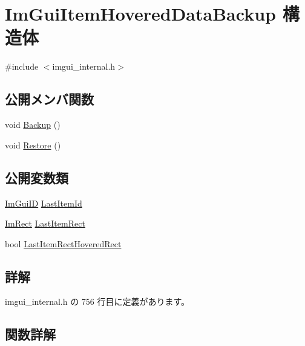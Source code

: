 \hypertarget{struct_im_gui_item_hovered_data_backup}{}\section{Im\+Gui\+Item\+Hovered\+Data\+Backup 構造体}
\label{struct_im_gui_item_hovered_data_backup}


{\ttfamily \#include $<$imgui\+\_\+internal.\+h$>$}

\subsection*{公開メンバ関数}
\begin{DoxyCompactItemize}
\item 
void \mbox{\hyperlink{struct_im_gui_item_hovered_data_backup_a2084500d9cbc9455e52fbe87c95f2315}{Backup}} ()
\item 
void \mbox{\hyperlink{struct_im_gui_item_hovered_data_backup_a4d807799df14f74bde55482134b076cc}{Restore}} ()
\end{DoxyCompactItemize}
\subsection*{公開変数類}
\begin{DoxyCompactItemize}
\item 
\mbox{\hyperlink{imgui_8h_a1785c9b6f4e16406764a85f32582236f}{Im\+Gui\+ID}} \mbox{\hyperlink{struct_im_gui_item_hovered_data_backup_a5e0b18013d983269deba7976666fc501}{Last\+Item\+Id}}
\item 
\mbox{\hyperlink{struct_im_rect}{Im\+Rect}} \mbox{\hyperlink{struct_im_gui_item_hovered_data_backup_ae489c222bed561950104a46ddf1387f3}{Last\+Item\+Rect}}
\item 
bool \mbox{\hyperlink{struct_im_gui_item_hovered_data_backup_a48dd47c573d5299de25be908d77f23f0}{Last\+Item\+Rect\+Hovered\+Rect}}
\end{DoxyCompactItemize}


\subsection{詳解}


 imgui\+\_\+internal.\+h の 756 行目に定義があります。



\subsection{関数詳解}
\mbox{\label{struct_im_gui_item_hovered_data_backup_a2084500d9cbc9455e52fbe87c95f2315}} 
